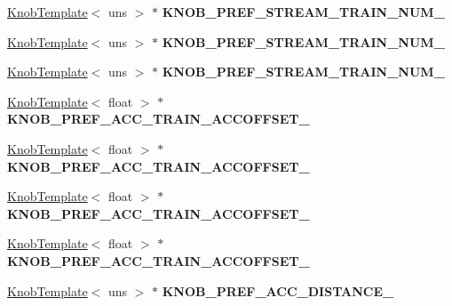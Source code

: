 \begin{DoxyCompactItemize}
\item 
\hypertarget{classall__knobs__c_aa2a48580fcab2af1a712af5dfb7f5d86}{
\hyperlink{classKnobTemplate}{KnobTemplate}$<$ uns $>$ $\ast$ {\bfseries KNOB\_\-PREF\_\-STREAM\_\-TRAIN\_\-NUM\_}}
\label{classall__knobs__c_aa2a48580fcab2af1a712af5dfb7f5d86}

\item 
\hypertarget{classall__knobs__c_ad87c9b5c484a3563dda70a260a2caddf}{
\hyperlink{classKnobTemplate}{KnobTemplate}$<$ uns $>$ $\ast$ {\bfseries KNOB\_\-PREF\_\-STREAM\_\-TRAIN\_\-NUM\_}}
\label{classall__knobs__c_ad87c9b5c484a3563dda70a260a2caddf}

\item 
\hypertarget{classall__knobs__c_a5d8c73113b45f8494f309c1579893d83}{
\hyperlink{classKnobTemplate}{KnobTemplate}$<$ uns $>$ $\ast$ {\bfseries KNOB\_\-PREF\_\-STREAM\_\-TRAIN\_\-NUM\_}}
\label{classall__knobs__c_a5d8c73113b45f8494f309c1579893d83}

\item 
\hypertarget{classall__knobs__c_a321e986ead1c0f15b3010e3bb5b023f5}{
\hyperlink{classKnobTemplate}{KnobTemplate}$<$ float $>$ $\ast$ {\bfseries KNOB\_\-PREF\_\-ACC\_\-TRAIN\_\-ACCOFFSET\_}}
\label{classall__knobs__c_a321e986ead1c0f15b3010e3bb5b023f5}

\item 
\hypertarget{classall__knobs__c_a6308c89946dee31233541f9908e1f3e3}{
\hyperlink{classKnobTemplate}{KnobTemplate}$<$ float $>$ $\ast$ {\bfseries KNOB\_\-PREF\_\-ACC\_\-TRAIN\_\-ACCOFFSET\_}}
\label{classall__knobs__c_a6308c89946dee31233541f9908e1f3e3}

\item 
\hypertarget{classall__knobs__c_a2fd989cb2ecd41f26f78a4a167df1455}{
\hyperlink{classKnobTemplate}{KnobTemplate}$<$ float $>$ $\ast$ {\bfseries KNOB\_\-PREF\_\-ACC\_\-TRAIN\_\-ACCOFFSET\_}}
\label{classall__knobs__c_a2fd989cb2ecd41f26f78a4a167df1455}

\item 
\hypertarget{classall__knobs__c_a0d97cbe43a3d2c4395e929a0a8d2ffeb}{
\hyperlink{classKnobTemplate}{KnobTemplate}$<$ float $>$ $\ast$ {\bfseries KNOB\_\-PREF\_\-ACC\_\-TRAIN\_\-ACCOFFSET\_}}
\label{classall__knobs__c_a0d97cbe43a3d2c4395e929a0a8d2ffeb}

\item 
\hypertarget{classall__knobs__c_ae46841dc65dea302101dfc0f4d76331a}{
\hyperlink{classKnobTemplate}{KnobTemplate}$<$ uns $>$ $\ast$ {\bfseries KNOB\_\-PREF\_\-ACC\_\-DISTANCE\_}}
\label{classall__knobs__c_ae46841dc65dea302101dfc0f4d76331a}


\end{DoxyCompactItemize}
